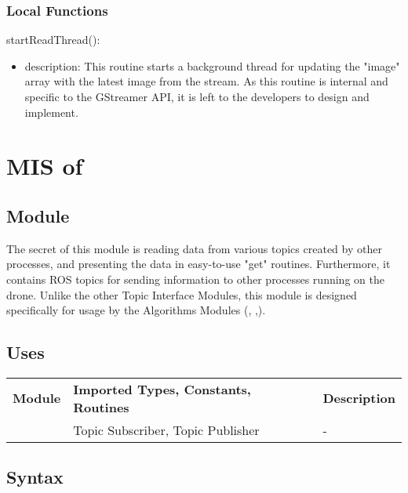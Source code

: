 \documentclass[12pt, titlepage]{article}
\begin{document}
\subsubsection{Local Functions}
\noindent startReadThread():
\begin{itemize}
\item description: This routine starts a background thread for updating the "image" array with the latest image from the stream. As this routine is internal and specific to the GStreamer API, it is left to the developers to design and implement. 
\end{itemize}
\newpage






\section{MIS of } \label{MIS_ALGO_TI} 
\subsection{Module}
The secret of this module is reading data from various topics created by other processes, and presenting the data in easy-to-use "get" routines. Furthermore, it contains ROS topics for sending information to other processes running on the drone. Unlike the other Topic Interface Modules, this module is designed specifically for usage by the Algorithms Modules (, ,).
\subsection{Uses}
\begin{center}
\begin{tabular}{p{2 cm} p{5cm} p{6.5cm} } 
\hline
\textbf{Module} & \textbf{Imported Types, Constants, Routines} & \textbf{Description} \\
\nameref{ROS} & Topic Subscriber, Topic Publisher & - \\
\hline
\hline
\end{tabular}
\end{center}
\subsection{Syntax}
\end{document}
